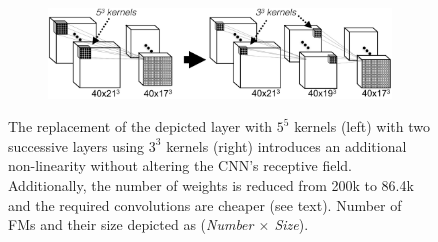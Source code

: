 
\begin{figure}[!h]
\centering
\begin{subfigure}[b]{0.5\textwidth}
\centering
	\includegraphics[clip=true, trim=0pt 0pt 0pt 0pt, width=1.0\textwidth]{figures/methodSection/deepProblems/deeper3x3.png}
\end{subfigure}

\caption{The replacement of the depicted layer with $5^5$ kernels (left) with two successive layers using $3^3$ kernels (right) introduces an additional non-linearity without altering the CNN's receptive field. Additionally, the number of weights is reduced from 200k to 86.4k and the required convolutions are cheaper (see text). Number of FMs and their size depicted as (\textit{Number $\times$ Size}).}
\label{fig:deeper3x3}
\end{figure}
